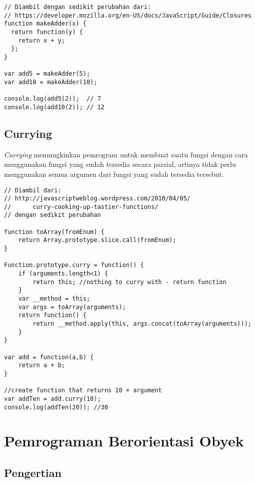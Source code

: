 \lstset{language=JavaScript,caption=Closure di JavaScript}
\begin{lstlisting}
// Diambil dengan sedikit perubahan dari:
// https://developer.mozilla.org/en-US/docs/JavaScript/Guide/Closures
function makeAdder(x) {
  return function(y) {
    return x + y;
  };
}
 
var add5 = makeAdder(5);
var add10 = makeAdder(10);
 
console.log(add5(2));  // 7
console.log(add10(2)); // 12
\end{lstlisting}

\subsection{Currying}

\textit{Currying} memungkinkan pemrogram untuk membuat suatu fungsi dengan cara menggunakan fungsi yang sudah tersedia secara parsial, artinya tidak perlu menggunakan semua argumen dari fungsi yang sudah tersedia tersebut.

\lstset{language=JavaScript,caption=Currying di JavaScript}
\begin{lstlisting}
// Diambil dari:
// http://javascriptweblog.wordpress.com/2010/04/05/
// 		curry-cooking-up-tastier-functions/
// dengan sedikit perubahan

function toArray(fromEnum) {
    return Array.prototype.slice.call(fromEnum);
}

Function.prototype.curry = function() {
    if (arguments.length<1) {
        return this; //nothing to curry with - return function
    }
    var __method = this;
    var args = toArray(arguments);
    return function() {
        return __method.apply(this, args.concat(toArray(arguments)));
    }
}

var add = function(a,b) {
    return a + b;
}

//create function that returns 10 + argument
var addTen = add.curry(10); 
console.log(addTen(20)); //30
\end{lstlisting}


\section{Pemrograman Berorientasi Obyek}

\subsection{Pengertian}

